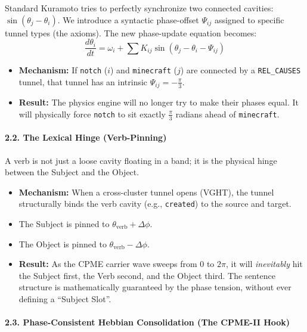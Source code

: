 \documentclass[
  11pt,
  a4paper,
]{article}
\providecommand{\tightlist}{%
  \setlength{\itemsep}{0pt}\setlength{\parskip}{0pt}}
\begin{document}
Standard Kuramoto tries to perfectly synchronize two connected cavities:
\(\sin(\theta_j - \theta_i)\). We introduce a syntactic phase-offset
\(\Psi_{ij}\) assigned to specific tunnel types (the axioms). The new
phase-update equation becomes:
\[ \frac{d\theta_i}{dt} = \omega_i + \sum K_{ij} \sin(\theta_j - \theta_i - \Psi_{ij}) \]

\begin{itemize}
\tightlist
\item
  \textbf{Mechanism:} If \texttt{notch} (\(i\)) and \texttt{minecraft}
  (\(j\)) are connected by a \texttt{REL\_CAUSES} tunnel, that tunnel
  has an intrinsic \(\Psi_{ij} = -\frac{\pi}{3}\).
\item
  \textbf{Result:} The physics engine will no longer try to make their
  phases equal. It will physically force \texttt{notch} to sit exactly
  \(\frac{\pi}{3}\) radians ahead of \texttt{minecraft}.
\end{itemize}

\paragraph{2.2. The Lexical Hinge
(Verb-Pinning)}\label{the-lexical-hinge-verb-pinning}

A verb is not just a loose cavity floating in a band; it is the physical
hinge between the Subject and the Object.

\begin{itemize}
\tightlist
\item
  \textbf{Mechanism:} When a cross-cluster tunnel opens (VGHT), the
  tunnel structurally binds the verb cavity (e.g., \texttt{created}) to
  the source and target.
\item
  The Subject is pinned to \(\theta_{\text{verb}} + \Delta\phi\).
\item
  The Object is pinned to \(\theta_{\text{verb}} - \Delta\phi\).
\item
  \textbf{Result:} As the CPME carrier wave sweeps from \(0\) to
  \(2\pi\), it will \emph{inevitably} hit the Subject first, the Verb
  second, and the Object third. The sentence structure is mathematically
  guaranteed by the phase tension, without ever defining a ``Subject
  Slot''.
\end{itemize}

\paragraph{2.3. Phase-Consistent Hebbian Consolidation (The CPME-II
Hook)}\label{phase-consistent-hebbian-consolidation-the-cpme-ii-hook}
\end{document}
